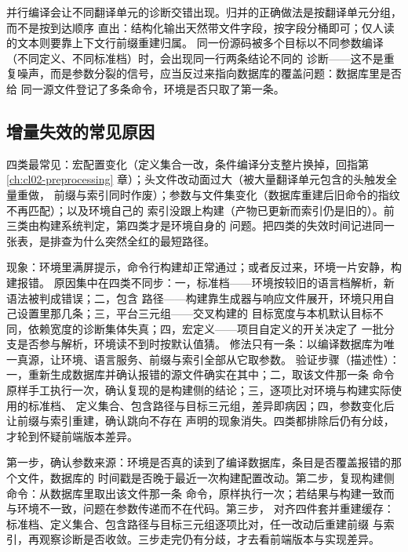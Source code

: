 \documentclass[12pt,a4paper,fontset=fandol]{ctexbook}
\begin{document}
并行编译会让不同翻译单元的诊断交错出现。归并的正确做法是按翻译单元分组，而不是按到达顺序
直出：结构化输出天然带文件字段，按字段分桶即可；仅人读的文本则要靠上下文行前缀重建归属。
同一份源码被多个目标以不同参数编译（不同定义、不同标准档）时，会出现同一行两条结论不同的
诊断——这不是重复噪声，而是参数分裂的信号，应当反过来指向数据库的覆盖问题：数据库里是否给
同一源文件登记了多条命令，环境是否只取了第一条。

\subsection{增量失效的常见原因}\label{sec:cl14-invalidate}

四类最常见：宏配置变化（定义集合一改，条件编译分支整片换掉，回指第
\ref{ch:cl02-preprocessing} 章）；头文件改动面过大（被大量翻译单元包含的头触发全量重做，
前缀与索引同时作废）；参数与文件集变化（数据库重建后旧命令的指纹不再匹配）；以及环境自己的
索引没跟上构建（产物已更新而索引仍是旧的）。前三类由构建系统判定，第四类才是环境自身的
问题。把四类的失效时间记进同一张表，是排查为什么突然全红的最短路径。

\begin{abibox}[title={同一段代码，IDE 与编译器结论不同}]
现象：环境里满屏提示，命令行构建却正常通过；或者反过来，环境一片安静，构建报错。
原因集中在四类不同步：一，标准档——环境按较旧的语言档解析，新语法被判成错误；二，包含
路径——构建靠生成器与响应文件展开，环境只用自己设置里那几条；三，平台三元组——交叉构建的
目标宽度与本机默认目标不同，依赖宽度的诊断集体失真；四，宏定义——项目自定义的开关决定了
一批分支是否参与解析，环境读不到时按默认值猜。
修法只有一条：以编译数据库为唯一真源，让环境、语言服务、前缀与索引全部从它取参数。
验证步骤（描述性）：一，重新生成数据库并确认报错的源文件确实在其中；二，取该文件那一条
命令原样手工执行一次，确认复现的是构建侧的结论；三，逐项比对环境与构建实际使用的标准档、
定义集合、包含路径与目标三元组，差异即病因；四，参数变化后让前缀与索引重建，确认跳向不存在
声明的现象消失。四类都排除后仍有分歧，才轮到怀疑前端版本差异。
\end{abibox}

\begin{bestpractice}[title={把环境报错当构建配置缺陷排查的三步}]
第一步，确认参数来源：环境是否真的读到了编译数据库，条目是否覆盖报错的那个文件，数据库的
时间戳是否晚于最近一次构建配置改动。第二步，复现构建侧命令：从数据库里取出该文件那一条
命令，原样执行一次；若结果与构建一致而与环境不一致，问题在参数传递而不在代码。第三步，
对齐四件套并重建缓存：标准档、定义集合、包含路径与目标三元组逐项比对，任一改动后重建前缀
与索引，再观察诊断是否收敛。三步走完仍有分歧，才去看前端版本与实现差异。
\end{bestpractice}
\end{document}
